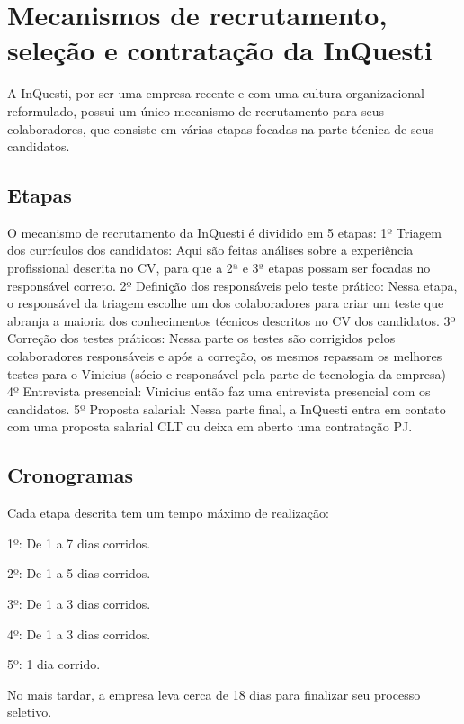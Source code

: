 \chapter{Mecanismos de recrutamento, seleção e contratação da InQuesti}
A InQuesti, por ser uma empresa recente e com uma cultura organizacional reformulado, possui um único mecanismo de recrutamento para seus colaboradores, que consiste em várias etapas focadas na parte técnica de seus candidatos.

\section{Etapas}
O mecanismo de recrutamento da InQuesti é dividido em 5 etapas:
1º Triagem dos currículos dos candidatos: Aqui são feitas análises sobre a experiência profissional descrita no CV, para que a 2ª e 3ª etapas possam ser focadas no responsável correto.
2º Definição dos responsáveis pelo teste prático: Nessa etapa, o responsável da triagem escolhe um dos colaboradores para criar um teste que abranja a maioria dos conhecimentos técnicos descritos no CV dos candidatos.
3º Correção dos testes práticos: Nessa parte os testes são corrigidos pelos colaboradores responsáveis e após a correção, os mesmos repassam os melhores testes para o Vinicius (sócio e responsável pela parte de tecnologia da empresa)
4º Entrevista presencial: Vinicius então faz uma entrevista presencial com os candidatos.
5º Proposta salarial: Nessa parte final, a InQuesti entra em contato com uma proposta salarial CLT ou deixa em aberto uma contratação PJ.

\section{Cronogramas}
Cada etapa descrita tem um tempo máximo de realização:

1º: De 1 a 7 dias corridos.

2º: De 1 a 5 dias corridos.

3º: De 1 a 3 dias corridos.

4º: De 1 a 3 dias corridos.

5º: 1 dia corrido.

No mais tardar, a empresa leva cerca de 18 dias para finalizar seu processo seletivo.
